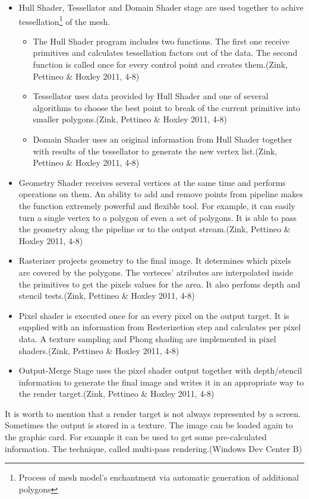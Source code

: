\documentclass[twoside, english, 11pt]{report}
\begin{document}
\begin{itemize}
\item Hull Shader, Tessellator and Domain Shader stage are used together to achive tessellation\footnote{Process of mesh model's enchantment via automatic generation of additional polygons} of the mesh.
  \begin{itemize}
    \item The Hull Shader program includes two functions. The first one receive primitives and calculates tessellation factors out of the data. The second function is called once for every control point and creates them.(Zink, Pettineo \& Hoxley 2011, 4-8)
    \item Tessellator uses data provided by Hull Shader and one of several algorithms to choose the best point to break of the current primitive into smaller polygons.(Zink, Pettineo \& Hoxley 2011, 4-8)
    \item Domain Shader uses an original information from Hull Shader together with results of the tessellator to generate the new vertex list.(Zink, Pettineo \& Hoxley 2011, 4-8)
  \end{itemize}
\item Geometry Shader receives several vertices at the same time and performs operations on them. An ability to add and remove points from pipeline makes the function extremely powerful and flexible tool. For example, it can easily turn a single vertex to a polygon of even a set of polygons. It is able to pass the geometry along the pipeline or to the output stream.(Zink, Pettineo \& Hoxley 2011, 4-8)
\item Rasterizer projects geometry to the final image. It determines which pixels are covered by the polygons. The verteces' atributes are interpolated inside the primitives to get the pixels values for the area. It also perfoms depth and stencil tests.(Zink, Pettineo \& Hoxley 2011, 4-8)
\item Pixel shader is executed once for an every pixel on the output target. It is supplied with an information from Resterizetion step and calculates per pixel data. A texture sampling and Phong shading are implemented in pixel shaders.(Zink, Pettineo \& Hoxley 2011, 4-8)
\item Output-Merge Stage uses the pixel shader output together with depth/stencil information to generate the final image and writes it in an appropriate way to the render target.(Zink, Pettineo \& Hoxley 2011, 4-8)
\end{itemize}

It is worth to mention that a render target is not always represented by a screen. Sometimes the output is stored in a texture. The image can be loaded again to the graphic card. For example it can be used to get some pre-calculated information. The technique, called multi-pass rendering.(Windows Dev Center B)
\end{document}
